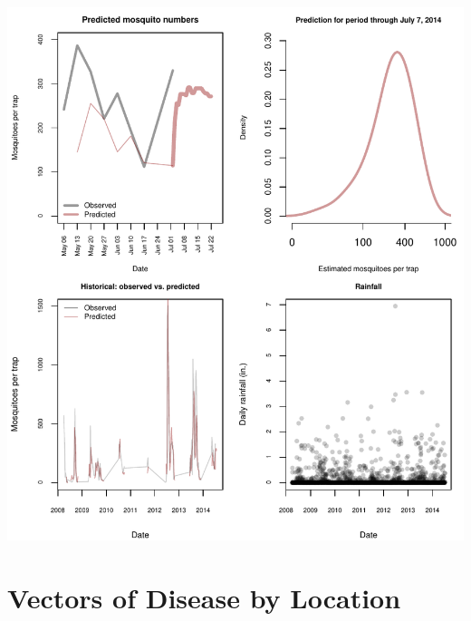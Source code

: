\documentclass{article}
\begin{document}
\includegraphics{mosquitoReport-006}


\newpage

\section*{Vectors of Disease by Location}
\hrulefill
\vspace{5mm}
\end{document}
